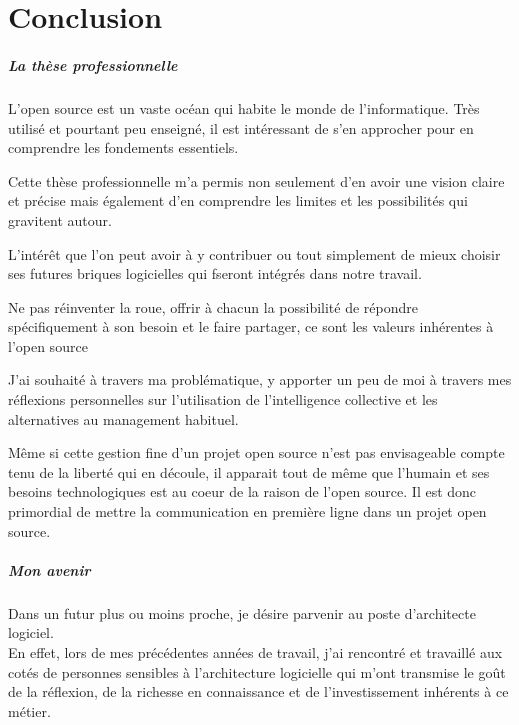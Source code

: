 \chapter{Conclusion}

\paragraph{La thèse professionnelle\\}

	L'open source est un vaste océan qui habite le monde de l'informatique. Très utilisé et pourtant peu enseigné, il est intéressant de s'en approcher pour en comprendre les fondements essentiels. 

	Cette thèse professionnelle m'a permis non seulement d'en avoir une vision claire et précise mais également d'en comprendre les limites et les possibilités qui gravitent autour.

	L'intérêt que l'on peut avoir à y contribuer ou tout simplement de mieux choisir ses futures briques logicielles qui fseront intégrés dans notre travail.

	Ne pas réinventer la roue, offrir à chacun la possibilité de répondre spécifiquement à son besoin et le faire partager, ce sont les valeurs inhérentes à l'open source

	J'ai souhaité à travers ma problématique, y apporter un peu de moi à travers mes réflexions personnelles sur l'utilisation de l'intelligence collective et les alternatives au management habituel.

	Même si cette gestion fine d'un projet open source n'est pas envisageable compte tenu de la liberté qui en découle, il apparait tout de même que l'humain et ses besoins technologiques est au coeur de la raison de l'open source. Il est donc primordial de mettre la communication en première ligne dans un projet open source.

\paragraph{Mon avenir\\}

	Dans un futur plus ou moins proche, je désire parvenir au poste d'architecte logiciel.\\

	En effet, lors de mes précédentes années de travail, j'ai rencontré et travaillé aux cotés de personnes sensibles à l'architecture logicielle qui m'ont transmise le goût de la réflexion, de la richesse en connaissance et de l'investissement inhérents à ce métier.

